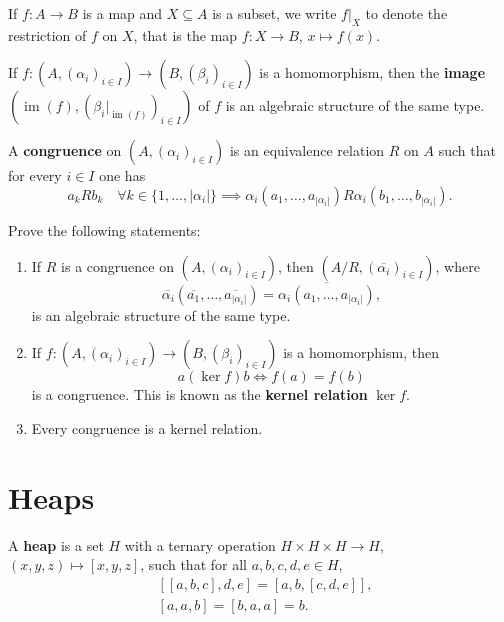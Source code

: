 \documentclass[graybox]{svmult}
\newcommand{\im}{\operatorname{im}}
\begin{document}
If $f\colon A\to B$ is a map and $X\subseteq A$ is a subset, 
we write $f|_X$ to denote 
the restriction of $f$ on $X$, that is the
map $f\colon X\to B$, $x\mapsto f(x)$. 

\begin{exercise}
    If $f\colon (A,(\alpha_i)_{i\in I})\to (B,(\beta_i)_{i\in I})$ is
    a homomorphism, then the \textbf{image}  
    $\left(\im(f),(\beta_i|_{\im(f)})_{i\in I}\right)$ of $f$ 
    is an algebraic structure of the same type. 
\end{exercise}

\begin{definition}
    A \textbf{congruence} on 
    $(A,(\alpha_i)_{i\in I})$ is an equivalence relation $R$ on $A$ 
    such that for every $i\in I$ one has 
    \[
    a_k R b_k\quad\forall k\in\{1,\dots,|\alpha_i|\}\implies \alpha_i(a_1,\dots,a_{|\alpha_i|}) R \alpha_i(b_1,\dots,b_{|\alpha_i|}).
    \]
\end{definition}

\begin{exercise}
Prove the following statements:
\begin{enumerate}
    \item If $R$ is a congruence on $(A,(\alpha_i)_{i\in I})$, then 
    $\left(A/R,(\overline{\alpha_i})_{i\in I}\right)$, 
    where 
    \[
    \overline{\alpha_i}(\overline{a_1},\dots,\overline{a_{|\alpha_i|}})
    =\overline{\alpha_i(a_1,\dots,a_{|\alpha_i|})},
    \]
    is an algebraic structure of the same type. 
    \item If $f\colon (A,(\alpha_i)_{i\in I})\to (B,(\beta_i)_{i\in I})$ is a homomorphism, 
    then 
    \[
    a(\ker f)b\Longleftrightarrow f(a)=f(b)
    \]
    is a congruence. This is known as the \textbf{kernel relation}
    $\ker f$.  
    \item Every congruence is a kernel relation. 
\end{enumerate}
\end{exercise}

\section{Heaps}

\begin{definition}
A \textbf{heap} is a set $H$ with a ternary operation $H\times H\times H\to H$, $(x,y,z)\mapsto [x,y,z]$, 
such that for all $a,b,c,d,e\in H$, 
\begin{align}
    &[[a,b,c],d,e]=[a,b,[c,d,e]],\\
    \label{eq:Malcev}&[a,a,b]=[b,a,a]=b.
\end{align}
\end{definition}
\end{document}
